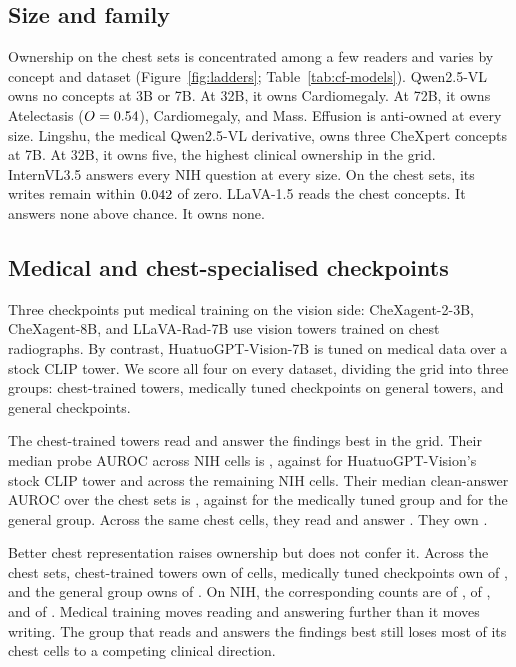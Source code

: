 \documentclass{article}
\begin{document}
\subsection{Size and family}
\label{sec:families}

Ownership on the chest sets is concentrated among a few readers and varies by concept and dataset (Figure~\ref{fig:ladders}; Table~\ref{tab:cf-models}). Qwen2.5-VL owns no concepts at 3B or 7B. At 32B, it owns Cardiomegaly. At 72B, it owns Atelectasis ($O=0.54$), Cardiomegaly, and Mass. Effusion is anti-owned at every size. Lingshu, the medical Qwen2.5-VL derivative, owns three CheXpert concepts at 7B. At 32B, it owns five, the highest clinical ownership in the grid. InternVL3.5 answers every NIH question at every size. On the chest sets, its writes remain within $0.042$ of zero. LLaVA-1.5 reads the chest concepts. It answers none above chance. It owns none.

\subsection{Medical and chest-specialised checkpoints}
\label{sec:specialisation}

Three checkpoints put medical training on the vision side: CheXagent-2-3B, CheXagent-8B, and LLaVA-Rad-7B use vision towers trained on chest radiographs. By contrast, HuatuoGPT-Vision-7B is tuned on medical data over a stock CLIP tower. We score all four on every dataset, dividing the grid into three groups: chest-trained towers, medically tuned checkpoints on general towers, and general checkpoints.

The chest-trained towers read and answer the findings best in the grid. Their median probe AUROC across \cfSpecTowerProbeN{} NIH cells is \cfSpecTowerProbeAuroc{}, against \cfSpecStockProbeAuroc{} for HuatuoGPT-Vision's stock CLIP tower and \cfSpecRestProbeAuroc{} across the \cfSpecRestProbeN{} remaining NIH cells. Their median clean-answer AUROC over the chest sets is \cfSpecTowerAnsAuroc{}, against \cfSpecMedAnsAuroc{} for the medically tuned group and \cfSpecGenAnsAuroc{} for the general group. Across the same \cfSpecTowerN{} chest cells, they read \cfSpecTowerReadable{} and answer \cfSpecTowerAnswerable{}. They own \cfSpecTowerOwned{}.

Better chest representation raises ownership but does not confer it. Across the chest sets, chest-trained towers own \cfSpecTowerOwned{} of \cfSpecTowerN{} cells, medically tuned checkpoints own \cfSpecMedOwned{} of \cfSpecMedN{}, and the general group owns \cfSpecGenOwned{} of \cfSpecGenN{}. On NIH, the corresponding counts are \cfSpecNihTowerOwned{} of \cfSpecNihTowerN{}, \cfSpecNihMedOwned{} of \cfSpecNihMedN{}, and \cfSpecNihGenOwned{} of \cfSpecNihGenN{}. Medical training moves reading and answering further than it moves writing. The group that reads and answers the findings best still loses most of its chest cells to a competing clinical direction.
\end{document}

